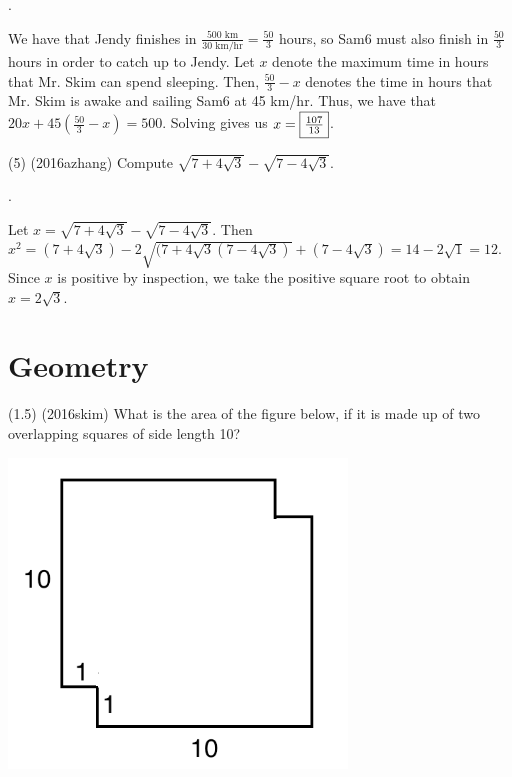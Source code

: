 \documentclass[11pt]{article}
\begin{document}
\begin{answer}
.
\end{answer}

\begin{solution}
We have that Jendy finishes in $\frac{500 \text{ km}}{30 \text{ km/hr}} = \frac{50}{3}$ hours, so Sam6 must also finish in $\frac{50}{3}$ hours in order to catch up to Jendy. Let $x$ denote the maximum time in hours that Mr. Skim can spend sleeping. Then, $\frac{50}{3} - x$ denotes the time in hours that Mr. Skim is awake and sailing Sam6 at 45 km/hr. Thus, we have that $20x + 45(\frac{50}{3}-x) = 500$. Solving gives us $x = \fbox{$\frac{107}{13}$}$.
\end{solution}

\begin{problem}
(5) (2016azhang) Compute $\sqrt{7+4\sqrt{3}} - \sqrt{7-4\sqrt{3}}$.
\end{problem}

\begin{answer}
.
\end{answer}

\begin{solution}
Let $x = \sqrt{7+4\sqrt{3}} - \sqrt{7-4\sqrt{3}}$. Then $x^2 = (7+4\sqrt{3}) - 2\sqrt{(7+4\sqrt{3}(7-4\sqrt{3})} + (7-4\sqrt{3}) = 14 - 2\sqrt{1} = 12$. Since $x$ is positive by inspection, we take the positive square root to obtain $x = 2\sqrt{3}$.
\end{solution}

\section{Geometry}

\begin{problem}
(1.5) (2016skim) What is the area of the figure below, if it is made up of two overlapping squares of side length 10?
\begin{center}
\includegraphics[width=9cm]{squares.png}
\end{center}
\end{problem}
\end{document}

